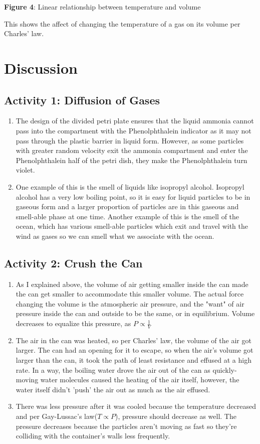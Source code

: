 \documentclass{article}
\begin{document}
\textbf{Figure 4}: Linear relationship between temperature and volume

This shows the affect of changing the temperature of a gas on its volume per Charles' law.
\section{Discussion}
\subsection{Activity 1: Diffusion of Gases}
\begin{enumerate}
        \item The design of the divided petri plate ensures that the liquid ammonia cannot pass into the compartment with the Phenolphthalein indicator as it may not pass through the plastic barrier in liquid form.  However, as some particles with greater random velocity exit the ammonia compartment and enter the Phenolphthalein half of the petri dish, they make the Phenolphthalein turn violet.
        \item One example of this is the smell of liquids like isopropyl alcohol.  Isopropyl alcohol has a very low boiling point, so it is easy for liquid particles to be in gaseous form and a larger proportion of particles are in this gaseous and smell-able phase at one time.  Another example of this is the smell of the ocean, which has various smell-able particles which exit and travel with the wind as gases so we can smell what we associate with the ocean.
    \end{enumerate}
\subsection{Activity 2: Crush the Can}
    \begin{enumerate}
        \item As I explained above, the volume of air getting smaller inside the can made the can get smaller to accommodate this smaller volume. The actual force changing the volume is the atmospheric air pressure, and the "want" of air pressure inside the can and outside to be the same, or in equilibrium. Volume decreases to equalize this pressure, as $P\propto \frac{1}{V}$
        \item The air in the can was heated, so per Charles' law, the volume of the air got larger.  The can had an opening for it to escape, so when the air's volume got larger than the can, it took the path of least resistance and effused at a high rate. In a way, the boiling water drove the air out of the can as quickly-moving water molecules caused the heating of the air itself, however, the water itself didn't 'push' the air out as much as the air effused.
        \item There was less pressure after it was cooled because the temperature decreased and per Gay-Lussac's law($T\propto P$), pressure should decrease as well. The pressure decreases because the particles aren't moving as fast so they're colliding with the container's walls less frequently. 
    \end{enumerate}
\end{document}
